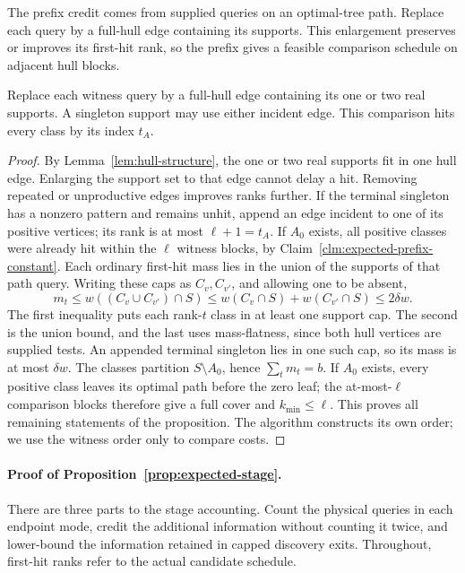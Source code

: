 The prefix credit comes from supplied queries on an optimal-tree path.
Replace each query by a full-hull edge containing its supports. This
enlargement preserves or improves its first-hit rank, so the prefix
gives a feasible comparison schedule on adjacent hull blocks.
\begin{claim}
\label{clm:expected-comparison-blocks}
Replace each witness query by a full-hull edge containing its one or
two real supports. A singleton support may use either incident edge.
This comparison hits every class by its index $t_A$.
\end{claim}
\begin{proof}
By Lemma~\ref{lem:hull-structure}, the one or two real supports
fit in one hull edge. Enlarging the support set to that edge
cannot delay a hit. Removing
repeated or unproductive edges improves ranks further. If the terminal
singleton has a nonzero pattern and remains unhit, append an edge
incident to one of its positive vertices; its rank is at most
$\ell+1=t_A$. If $A_0$ exists, all positive classes were already hit
within the $\ell$ witness blocks, by
Claim~\ref{clm:expected-prefix-constant}. Each ordinary first-hit mass lies
in the union of the supports of that path query. Writing these caps
as $C_v,C_{v'}$, and allowing one to be absent,
\[
 m_t\le w((C_v\cup C_{v'})\cap S)
       \le w(C_v\cap S)+w(C_{v'}\cap S)\le2\delta w.
\]
The first inequality puts each rank-$t$ class in at least one
support cap. The second is the union bound, and the last uses
mass-flatness, since both hull vertices are supplied tests.
An appended terminal singleton lies in one such cap, so its mass is
at most $\delta w$. The classes partition $S\setminus A_0$, hence
$\sum_t m_t=b$. If $A_0$ exists, every positive class leaves its
optimal path before the zero leaf; the at-most-$\ell$ comparison
blocks therefore give a full cover and $k_{\min}\le\ell$.
This proves all remaining statements of the proposition. The algorithm
constructs its own order; we use the witness order only to compare costs.
\end{proof}

\paragraph{Proof of Proposition~\ref{prop:expected-stage}.}
There are three parts to the stage accounting. Count the physical
queries in each endpoint mode, credit the additional information
without counting it twice, and lower-bound the information retained
in capped discovery exits. Throughout, first-hit ranks refer to the
actual candidate schedule.

